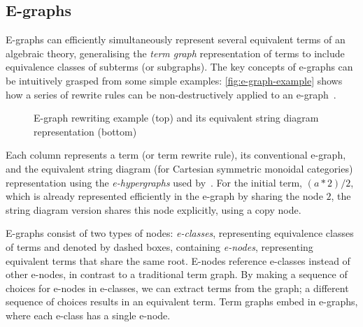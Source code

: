 \subsection{E-graphs}

E-graphs can efficiently simultaneously represent several equivalent terms of an algebraic theory, generalising the \emph{term graph} representation of terms to include equivalence classes of subterms (or subgraphs).
The key concepts of e-graphs can be intuitively grasped from some simple examples: \autoref{fig:e-graph-example} shows how a series of rewrite rules can be non-destructively applied to an e-graph~\cite{EggPaper}.
\begin{figure}
	\begin{center}
	\end{center}
	\caption{E-graph rewriting example (top) and its equivalent string diagram representation (bottom)~\cite{tiurin2025equivalencehypergraphsdporewriting}}
	\label{fig:e-graph-example}
\end{figure}

Each column represents a term (or term rewrite rule), its conventional e-graph, and the equivalent string diagram (for Cartesian symmetric monoidal categories) representation using the \emph{e-hypergraphs} used by~\citet{tiurin2025equivalencehypergraphsdporewriting}.
For the initial term, $(a*2)/2$, which is already represented efficiently in the e-graph by sharing the node $2$, the string diagram version shares this node explicitly, using a copy node.

E-graphs consist of two types of nodes: \emph{e-classes}, representing equivalence classes of terms and denoted by dashed boxes, containing \emph{e-nodes}, representing equivalent terms that share the same root.
E-nodes reference e-classes instead of other e-nodes, in contrast to a traditional term graph.
By making a sequence of choices for e-nodes in e-classes, we can extract terms from the graph; a different sequence of choices results in an equivalent term.
Term graphs embed in e-graphs, where each e-class has a single e-node.

